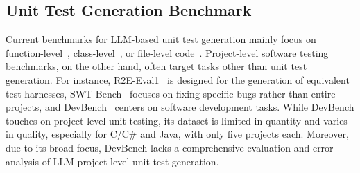 \subsection{Unit Test Generation Benchmark}
Current benchmarks for LLM-based unit test generation mainly focus on function-level~\cite{wang2024testeval}, class-level~\cite{du2023classeval}, or file-level code~\cite{jain2024testgeneval}. Project-level software testing benchmarks, on the other hand, often target tasks other than unit test generation. For instance, R2E-Eval1~\cite{jain2024r2e} is designed for the generation of equivalent test harnesses, SWT-Bench~\cite{mundler2024swt} focuses on fixing specific bugs rather than entire projects, and DevBench~\cite{li2024devbench} centers on software development tasks. 
While DevBench touches on project-level unit testing, its dataset is limited in quantity and varies in quality, especially for C/C\# and Java, with only five projects each. Moreover, due to its broad focus, DevBench lacks a comprehensive evaluation and error analysis of LLM project-level unit test generation.


